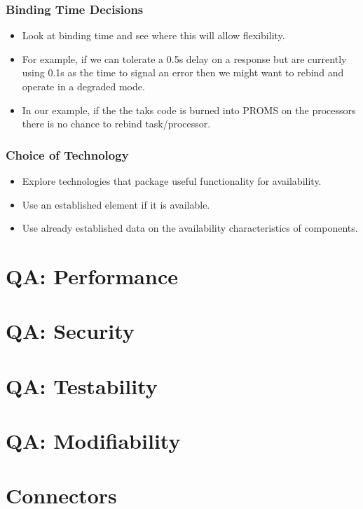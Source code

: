 \documentclass[a4paper]{article}
\begin{document}
\subsubsection{Binding Time Decisions}
\begin{itemize}
\item{Look at binding time and see where this will allow flexibility.}
\item{For example, if we can tolerate a 0.5s delay on a response but are currently using 0.1s as the time to signal an error then we might want to rebind and operate in a degraded mode.}
\item{In our example, if the the taks code is burned into PROMS on the processors there is no chance to rebind task/processor.}
\end{itemize}
\subsubsection{Choice of Technology}
\begin{itemize}
\item{Explore technologies that package useful functionality for availability.}
\item{Use an established element if it is available.}
\item{Use already established data on the availability characteristics of components.}
\end{itemize}


\section{QA: Performance}

\section{QA: Security}

\section{QA: Testability}

\section{QA: Modifiability}

\newpage
\section{Connectors}
\end{document}
